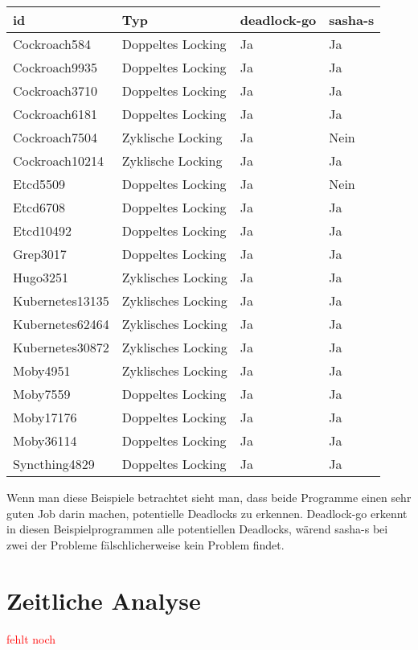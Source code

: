 \begin{table}[H]
\centering
\begin{tabular}{|l|l|l|l|}
\hline
\textbf{id} & \textbf{Typ} & \textbf{deadlock-go} & \textbf{sasha-s} \\ \hline
Cockroach584 & Doppeltes Locking & Ja & Ja \\ \hline
Cockroach9935 & Doppeltes Locking & Ja & Ja \\ \hline
Cockroach3710 & Doppeltes Locking & Ja & Ja \\ \hline
Cockroach6181 & Doppeltes Locking & Ja & Ja \\ \hline
Cockroach7504 & Zyklische Locking & Ja & Nein \\ \hline
Cockroach10214 & Zyklische Locking & Ja & Ja \\ \hline
Etcd5509 & Doppeltes Locking & Ja & Nein \\ \hline
Etcd6708 & Doppeltes Locking & Ja & Ja \\ \hline
Etcd10492 & Doppeltes Locking & Ja & Ja \\ \hline
Grep3017 & Doppeltes Locking & Ja & Ja \\ \hline
Hugo3251 & Zyklisches Locking & Ja & Ja \\ \hline
Kubernetes13135 & Zyklisches Locking & Ja & Ja \\ \hline
Kubernetes62464 & Zyklisches Locking & Ja & Ja \\ \hline
Kubernetes30872 & Zyklisches Locking & Ja & Ja \\ \hline
Moby4951 & Zyklisches Locking & Ja & Ja \\ \hline
Moby7559 & Doppeltes Locking & Ja & Ja \\ \hline
Moby17176 & Doppeltes Locking & Ja & Ja \\ \hline
Moby36114 & Doppeltes Locking & Ja & Ja \\ \hline
Syncthing4829 & Doppeltes Locking & Ja & Ja \\ \hline
\end{tabular}
\end{table}
Wenn man diese Beispiele betrachtet sieht man, dass beide Programme einen
sehr guten Job darin machen, potentielle Deadlocks zu erkennen. 
Deadlock-go erkennt in diesen Beispielprogrammen alle potentiellen
Deadlocks, wärend sasha-s bei zwei der Probleme fälschlicherweise 
kein Problem findet.

\section{Zeitliche Analyse}
\textcolor{red}{fehlt noch}
